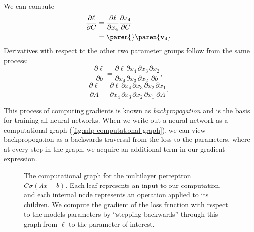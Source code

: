 We can compute
\begin{equation}
	\begin{aligned}
		\frac{\partial \ell}{\partial C}
		 & = \frac{\partial \ell}{\partial x_4}
		\frac{\partial x_4}{\partial C} \\
		&= \paren{}\paren{\mathbf v_4}
	\end{aligned}
\end{equation}
Derivatives with respect to the other two parameter groups follow from the same process:
\begin{equation*}
	\frac{\partial \ell}{\partial b}
	= \frac{\partial \ell}{\partial x_4}
	\frac{\partial x_4}{\partial x_3}
	\frac{\partial x_3}{\partial x_2}
	\frac{\partial x_2}{\partial b},
\end{equation*}
\begin{equation*}
	\frac{\partial \ell}{\partial A}
	= \frac{\partial \ell}{\partial x_4}
	\frac{\partial x_4}{\partial x_3}
	\frac{\partial x_3}{\partial x_2}
	\frac{\partial x_2}{\partial x_1}
	\frac{\partial x_1}{\partial A}.
\end{equation*}


This process of computing gradients is known as \emph{backpropogation} and is the basis for training all neural networks. When we write out a neural network as a computational graph (\autoref{fig:mlp-computational-graph}), we can view backpropogation as a backwards traversal from the loss to the parameters, where at every step in the graph, we acquire an additional term in our gradient expression.

\begin{figure}
	\centering
	\caption{The computational graph for the multilayer perceptron $C \sigma(Ax + b)$. Each leaf represents an input to our computation, and each internal node represents an operation applied to its children. We compute the gradient of the loss function with respect to the models parameters by ``stepping backwards'' through this graph from $\ell$ to the parameter of interest.}
	\label{fig:mlp-computational-graph}
\end{figure}

